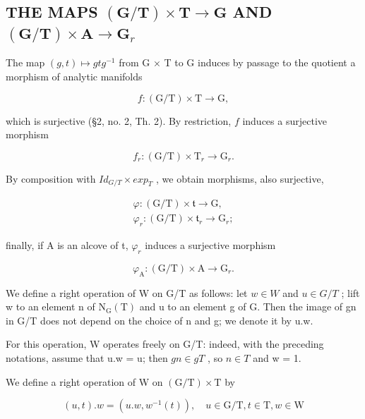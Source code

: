 \subsection{\texorpdfstring{THE MAPS \((\mathbf{G} / \mathbf{T})\times \mathbf{T}\to \mathbf{G}\) AND \((\mathbf{G} / \mathbf{T})\times \mathbf{A}\rightarrow \mathbf{G}_r\)}{THE MAPS (\textbackslash mathbf\{G\} / \textbackslash mathbf\{T\})\textbackslash times \textbackslash mathbf\{T\}\textbackslash to \textbackslash mathbf\{G\} AND (\textbackslash mathbf\{G\} / \textbackslash mathbf\{T\})\textbackslash times \textbackslash mathbf\{A\}\textbackslash rightarrow \textbackslash mathbf\{G\}\_r}}

The map \((g,t)\mapsto gtg^{-1}\) from G × T to G induces by passage to the quotient a morphism of analytic manifolds

\[
f: (\mathrm{G} / \mathrm{T}) \times \mathrm{T} \to \mathrm{G},
\]

which is surjective (§2, no. 2, Th. 2). By restriction, \(f\) induces a surjective morphism

\[
f _ {r}: (\mathrm{G} / \mathrm{T}) \times \mathrm{T} _ {r} \rightarrow \mathrm{G} _ {r}.
\]

By composition with \(Id_{G/T} \times exp_{T}\) , we obtain morphisms, also surjective,

\[
\begin{array}{c} \varphi : (\mathrm{G/T}) \times \mathfrak {t} \to \mathrm{G}, \\ \varphi_ {r}: (\mathrm{G/T}) \times \mathfrak {t} _ {r} \to \mathrm{G} _ {r}; \end{array}
\]

finally, if A is an alcove of t, \(\varphi_{r}\) induces a surjective morphism

\[
\varphi_ {\mathrm{A}}: (\mathrm{G/T}) \times \mathrm{A} \to \mathrm{G} _ {r}.
\]

We define a right operation of W on G/T as follows: let \(w \in W\) and \(u \in G/T\) ; lift w to an element n of \(\mathrm{N}_{\mathrm{G}}(\mathrm{T})\) and u to an element g of G. Then the image of gn in G/T does not depend on the choice of n and g; we denote it by u.w.

For this operation, W operates freely on G/T: indeed, with the preceding notations, assume that u.w = u; then \(gn \in gT\) , so \(n \in T\) and w = 1.

We define a right operation of W on \((\mathrm{G}/\mathrm{T}) \times \mathrm{T}\) by

\[
(u, t). w = (u. w, w ^ {- 1} (t)), \quad u \in \mathrm{G} / \mathrm{T}, t \in \mathrm{T}, w \in \mathrm{W}
\]

